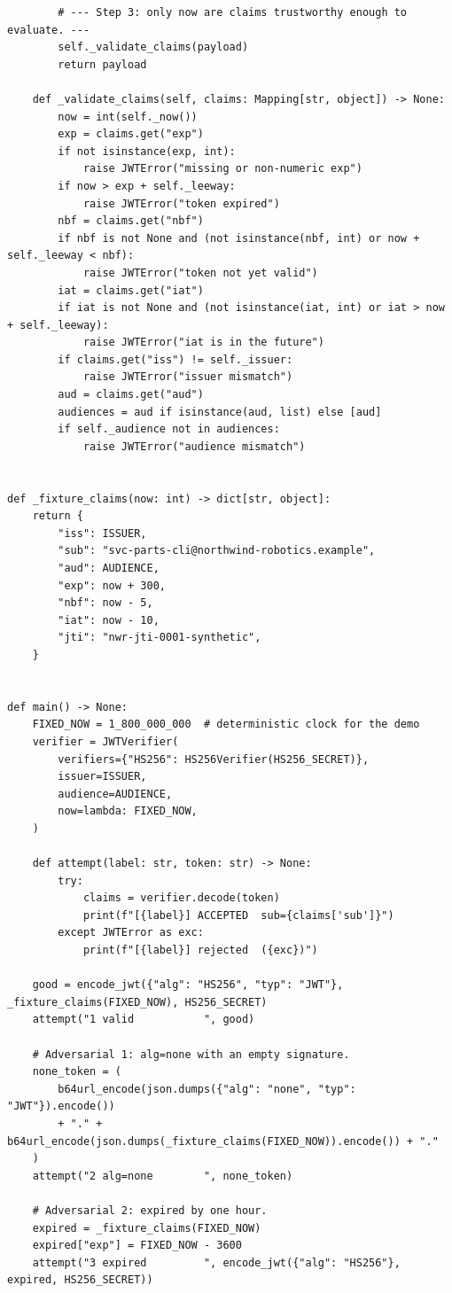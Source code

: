 \begin{verbatim}
        # --- Step 3: only now are claims trustworthy enough to evaluate. ---
        self._validate_claims(payload)
        return payload

    def _validate_claims(self, claims: Mapping[str, object]) -> None:
        now = int(self._now())
        exp = claims.get("exp")
        if not isinstance(exp, int):
            raise JWTError("missing or non-numeric exp")
        if now > exp + self._leeway:
            raise JWTError("token expired")
        nbf = claims.get("nbf")
        if nbf is not None and (not isinstance(nbf, int) or now + self._leeway < nbf):
            raise JWTError("token not yet valid")
        iat = claims.get("iat")
        if iat is not None and (not isinstance(iat, int) or iat > now + self._leeway):
            raise JWTError("iat is in the future")
        if claims.get("iss") != self._issuer:
            raise JWTError("issuer mismatch")
        aud = claims.get("aud")
        audiences = aud if isinstance(aud, list) else [aud]
        if self._audience not in audiences:
            raise JWTError("audience mismatch")


def _fixture_claims(now: int) -> dict[str, object]:
    return {
        "iss": ISSUER,
        "sub": "svc-parts-cli@northwind-robotics.example",
        "aud": AUDIENCE,
        "exp": now + 300,
        "nbf": now - 5,
        "iat": now - 10,
        "jti": "nwr-jti-0001-synthetic",
    }


def main() -> None:
    FIXED_NOW = 1_800_000_000  # deterministic clock for the demo
    verifier = JWTVerifier(
        verifiers={"HS256": HS256Verifier(HS256_SECRET)},
        issuer=ISSUER,
        audience=AUDIENCE,
        now=lambda: FIXED_NOW,
    )

    def attempt(label: str, token: str) -> None:
        try:
            claims = verifier.decode(token)
            print(f"[{label}] ACCEPTED  sub={claims['sub']}")
        except JWTError as exc:
            print(f"[{label}] rejected  ({exc})")

    good = encode_jwt({"alg": "HS256", "typ": "JWT"}, _fixture_claims(FIXED_NOW), HS256_SECRET)
    attempt("1 valid           ", good)

    # Adversarial 1: alg=none with an empty signature.
    none_token = (
        b64url_encode(json.dumps({"alg": "none", "typ": "JWT"}).encode())
        + "." + b64url_encode(json.dumps(_fixture_claims(FIXED_NOW)).encode()) + "."
    )
    attempt("2 alg=none        ", none_token)

    # Adversarial 2: expired by one hour.
    expired = _fixture_claims(FIXED_NOW)
    expired["exp"] = FIXED_NOW - 3600
    attempt("3 expired         ", encode_jwt({"alg": "HS256"}, expired, HS256_SECRET))


\end{verbatim}

